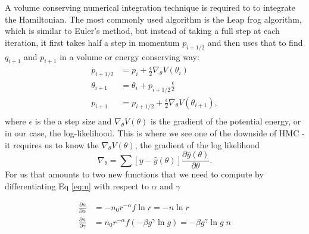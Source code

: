 \documentclass{article}
\begin{document}
A volume conserving numerical integration technique is required to to integrate the Hamiltonian. The most commonly used algorithm is the Leap frog algorithm, which is similar to Euler's method, but instead of taking a full step at each iteration, it first takes half a step in momentum $p_{i+1/2}$ and then uses that to find $q_{i+1}$ and $p_{i+1}$ in a volume or energy conserving way:
\begin{align}
    p_{i+1/2} &= p_i + \frac{\epsilon}{2} \nabla_\theta V(\theta_i)\\
    \theta_{i+1} &= \theta_i + p_{i+1/2} \frac{\epsilon}{2}\\
    p_{i+1} &= p_{i+1/2} + \frac{\epsilon}{2} \nabla_\theta V(\theta_{i+1}),\\
\end{align}
where $\epsilon$ is the a step size and $\nabla_\theta V(\theta)$ is the gradient of the potential energy, or in our case, the log-likelihood. This is where we see one of the downside of HMC - it requires us to know the $\nabla_\theta V(\theta)$, the gradient of the log likelihood
\begin{equation}
\nabla_\theta = \sum \left[y - \hat{y}(\theta)\right] \frac{\partial \hat{y}(\theta)}{\partial \theta}.
\end{equation}
For us that amounts to two new functions that we need to compute by differentiating Eq \eqref{eq:n} with respect to $\alpha$ and $\gamma$

\begin{align}
    \frac{\partial n}{\partial\alpha}
    &=-n_0 r^{-\alpha}f\ln r
    =-n\ln r\\
    \frac{\partial n}{\partial \gamma}
    &=n_0 r^{-\alpha} f(-\beta g^\gamma \ln g)
    =-\beta g^\gamma\ln g \; n
\end{align}
\end{document}

